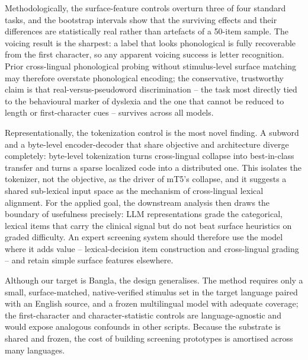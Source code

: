 \documentclass[preprint,12pt]{elsarticle}
\begin{document}
Methodologically, the surface-feature controls overturn three of four standard tasks, and the bootstrap intervals show that the surviving effects and their differences are statistically real rather than artefacts of a 50-item sample. The voicing result is the sharpest: a label that looks phonological is fully recoverable from the first character, so any apparent voicing success is letter recognition. Prior cross-lingual phonological probing without stimulus-level surface matching may therefore overstate phonological encoding; the conservative, trustworthy claim is that real-versus-pseudoword discrimination -- the task most directly tied to the behavioural marker of dyslexia and the one that cannot be reduced to length or first-character cues -- survives across all models.

Representationally, the tokenization control is the most novel finding. A subword and a byte-level encoder-decoder that share objective and architecture diverge completely: byte-level tokenization turns cross-lingual collapse into best-in-class transfer and turns a sparse localized code into a distributed one. This isolates the tokenizer, not the objective, as the driver of mT5's collapse, and it suggests a shared sub-lexical input space as the mechanism of cross-lingual lexical alignment. For the applied goal, the downstream analysis then draws the boundary of usefulness precisely: LLM representations grade the categorical, lexical items that carry the clinical signal but do not beat surface heuristics on graded difficulty. An expert screening system should therefore use the model where it adds value -- lexical-decision item construction and cross-lingual grading -- and retain simple surface features elsewhere.

Although our target is Bangla, the design generalises. The method requires only a small, surface-matched, native-verified stimulus set in the target language paired with an English source, and a frozen multilingual model with adequate coverage; the first-character and character-statistic controls are language-agnostic and would expose analogous confounds in other scripts. Because the substrate is shared and frozen, the cost of building screening prototypes is amortised across many languages.

\end{document}
